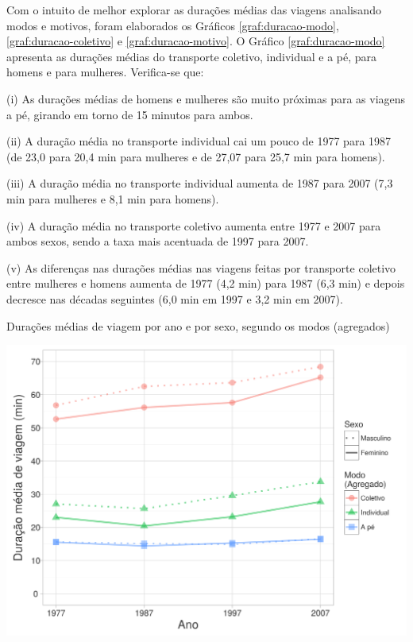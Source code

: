 Com o intuito de melhor explorar as durações médias das viagens analisando modos e motivos, foram elaborados os Gráficos \ref{graf:duracao-modo}, \ref{graf:duracao-coletivo} e \ref{graf:duracao-motivo}.
O Gráfico \ref{graf:duracao-modo} apresenta as durações médias do transporte coletivo, individual e a pé, para homens e para mulheres. Verifica-se que:
\begin{compactitem}[]
\item (i) As durações médias de homens e mulheres são muito próximas para as viagens a pé, girando em torno de 15 minutos para ambos.
\item (ii) A duração média no transporte individual cai um pouco de 1977 para 1987 (de 23,0 para 20,4 min para mulheres e de 27,07 para 25,7 min para homens).
\item (iii) A duração média no transporte individual aumenta de 1987 para 2007 (7,3 min para mulheres e 8,1 min para homens).
\item (iv) A duração média no transporte coletivo aumenta entre 1977 e 2007 para ambos sexos, sendo a taxa mais acentuada de 1997 para 2007. 
\item (v) As diferenças nas durações médias nas viagens feitas por transporte coletivo entre mulheres e homens aumenta de 1977 (4,2 min) para 1987 (6,3 min) e depois decresce nas décadas seguintes (6,0 min em 1997 e 3,2 min em 2007).
\end{compactitem}

\begin{grafico}[htb]%
    \caption{\label{graf:duracao-modo}Durações médias de viagem por ano e por sexo, segundo os modos (agregados)}%
    \begin{center}%
        \includegraphics[width=1\textwidth]{./imagens/duracao-modo.png}%
    \end{center}%
\end{grafico}%

